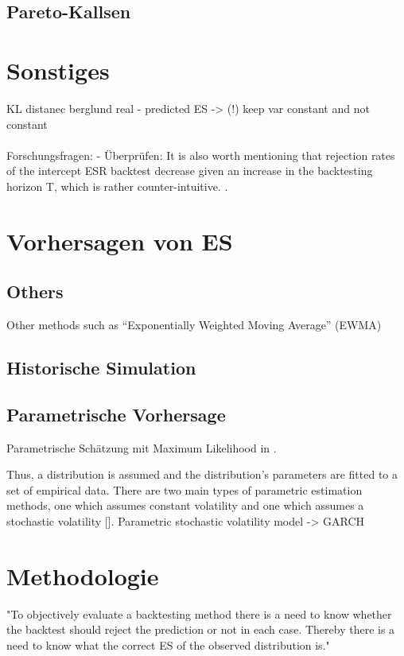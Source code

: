 \documentclass[12pt,a4paper]{article}
\begin{document}
	\subsection{Pareto-Kallsen}
	
	
	
	\section{Sonstiges}
	KL distanec
	berglund
	real - predicted ES -> (!) 
	keep var constant and not constant 
	\\\\
	Forschungsfragen:
	- Überprüfen: It is also worth mentioning that rejection rates of the intercept ESR backtest decrease given an increase in the backtesting horizon T, which is rather counter-intuitive. \cite{spring_backtesting_2021}.
	
	\section{Vorhersagen von ES}
	\subsection{Others}
	Other methods such as “Exponentially Weighted Moving Average” (EWMA)
	
	\subsection{Historische Simulation}
	
	\subsection{Parametrische Vorhersage}
	Parametrische Schätzung mit Maximum Likelihood in \cite{garcia_performance_2019}.
	
	Thus, a distribution is assumed and the distribution’s parameters are fitted to a set of empirical data.
	There are two main types of parametric estimation methods, one which assumes constant volatility and one which assumes a stochastic volatility [\cite{edberg_non-parametricbacktesting_2017}].
	Parametric stochastic volatility model -> GARCH
	
	\section{Methodologie}
	"To objectively evaluate a backtesting method there is a need to know whether the backtest should reject the prediction or not in each case. Thereby there is a need to know what the correct ES of the observed distribution is."
	
	
	
	
	
	
	
\end{document}
